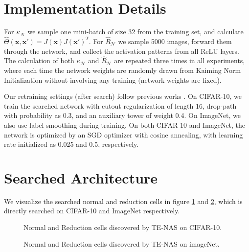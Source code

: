 \documentclass{article} \usepackage{iclr2021_conference,times}
\newcommand{\finntk}{\hat\Theta}
\begin{document}




\newpage

\appendix

\section{Implementation Details}\label{sec:implementations}

For $\kappa_\mathcal{N}$ we sample one mini-batch of size 32 from the training set, and calculate $\finntk(\bm{x}, \bm{x}') = J(\bm{x})J(\bm{x}')^T$. For $\hat{R}_\mathcal{N}$ we sample 5000 images, forward them through the network, and collect the activation patterns from all ReLU layers. The calculation of both $\kappa_\mathcal{N}$ and $\hat{R}_\mathcal{N}$ are repeated three times in all experiments, where each time the network weights are randomly drawn from Kaiming Norm Initialization \citep{he2015delving} without involving any training (network weights are fixed).

Our retraining settings (after search) follow previous works \citep{xu2019pc,chen2019progressive,chen2020stabilizing}. On CIFAR-10, we train the searched network with cutout regularization of length 16, drop-path \citep{zoph2018learning} with probability as 0.3, and an auxiliary tower of weight 0.4.
On ImageNet, we also use label smoothing during training.
On both CIFAR-10 and ImageNet, the network is optimized by an SGD optimizer with cosine annealing, with learning rate initialized as 0.025 and 0.5, respectively.

\section{Searched Architecture}

\label{app:vis}
We visualize the searched normal and reduction cells in figure \ref{fig:TE_cifar10} and \ref{fig:TE_imagenet}, which is directly searched on CIFAR-10 and ImageNet respectively.

\begin{figure}[!htb]
\centering
{}
\hfill
{}
\caption{Normal and Reduction cells discovered by TE-NAS on CIFAR-10.}
\label{fig:TE_cifar10}
\end{figure}

\begin{figure}[!htb]
\centering
{}
\hfill
{}
\caption{Normal and Reduction cells discovered by TE-NAS on imageNet.}
\label{fig:TE_imagenet}
\end{figure}
\end{document}
